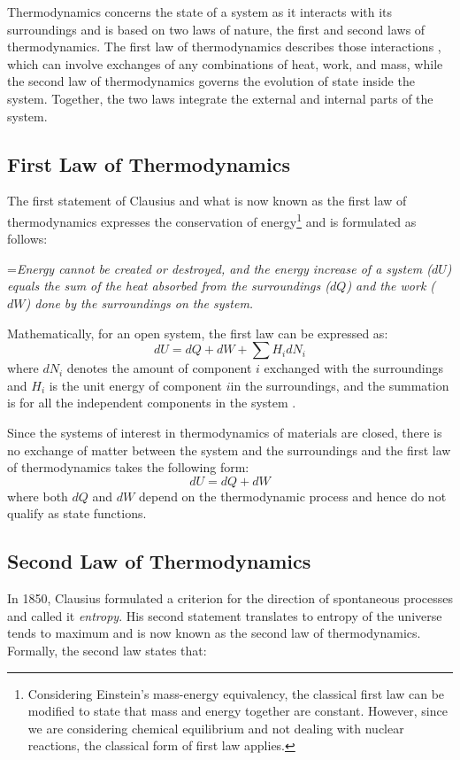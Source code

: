 	Thermodynamics concerns the state of a system as it interacts with its surroundings and is based on two laws of nature, the first and second laws of thermodynamics. The first law of thermodynamics describes those interactions , which can involve exchanges of any combinations of heat, work, and mass, while the second law of thermodynamics governs the evolution of state inside the system. Together, the two laws   integrate the external and internal parts of the system.

	\subsection{First Law of Thermodynamics}
	The first statement of Clausius and what is now known as the first law of thermodynamics expresses the conservation of energy\footnote{Considering Einstein's mass-energy equivalency, the classical first law can be modified to state that mass and energy together are constant. However, since we are considering chemical equilibrium and not dealing with nuclear reactions, the classical form of first law applies.} and is formulated as follows:

		\hangindent=\parindent \emph{Energy cannot be created or destroyed, and the energy increase of a system ($dU$) equals the sum of the heat absorbed from the surroundings ($dQ$) and the work ($dW$) done by the surroundings on the system.}

	\noindent Mathematically, for an open system, the first law can be expressed as:
	\begin{equation}\label{eqn:flot}
		dU = dQ + dW + \sum H_i dN_i
	\end{equation}
	where $dN_i$ denotes the amount of component $i$ exchanged with the surroundings and $H_i$ is the unit energy of component $i$in the surroundings, and the summation is for all the independent components in the system .

	Since the systems of interest in thermodynamics of materials are closed, there is no exchange of matter between the system and the surroundings and the first law of thermodynamics takes the following form:
	\begin{equation}\label{eqn:flot}
		dU = dQ + dW
	\end{equation}
	where both $dQ$ and $dW$ depend on the thermodynamic process and hence do not qualify as state functions.

	\subsection{Second Law of Thermodynamics}
	In 1850, Clausius formulated a criterion for the direction of spontaneous processes and called it \emph{entropy}. His second statement translates to entropy of the universe tends to maximum and is now known as the second law of thermodynamics. Formally, the second law states that:

